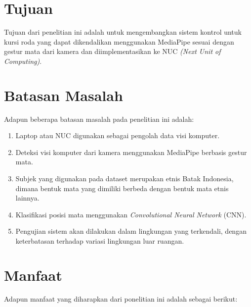 \section{Tujuan}
\label{sec:Tujuan}

Tujuan dari penelitian ini adalah untuk mengembangkan sistem kontrol untuk kursi roda yang dapat dikendalikan menggunakan MediaPipe sesuai dengan gestur mata dari kamera dan diimplementasikan ke NUC \textit{(Next Unit of Computing)}.

\section{Batasan Masalah}
\label{sec:batasanmasalah}

Adapun beberapa batasan masalah pada penelitian ini adalah:

\begin{enumerate}[nolistsep]

  \item Laptop atau NUC digunakan sebagai pengolah data visi komputer.
  
  \item Deteksi visi komputer dari kamera menggunakan MediaPipe berbasis gestur mata.

  \item Subjek yang digunakan pada dataset merupakan etnis Batak Indonesia, dimana bentuk mata yang dimiliki berbeda dengan bentuk mata etnis lainnya.

  \item Klasifikasi posisi mata menggunakan \emph{Convolutional Neural Network} (CNN).

  \item Pengujian sistem akan dilakukan dalam lingkungan yang terkendali, dengan keterbatasan terhadap variasi lingkungan luar ruangan.

\end{enumerate}

\section{Manfaat}


Adapun manfaat yang diharapkan dari ponelitian ini adalah sebagai berikut:

